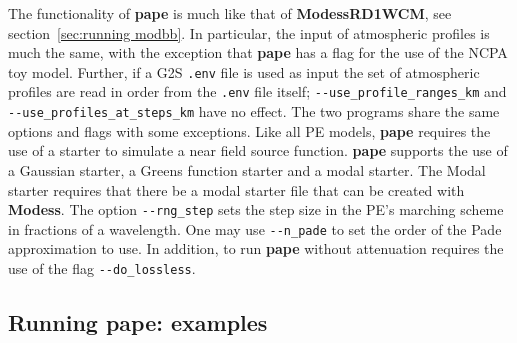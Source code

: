 The functionality of {\bf pape} is much like that of {\bf ModessRD1WCM}, see section~\ref{sec:running modbb}. In particular, the input of atmospheric profiles is much the same, with the exception that {\bf pape} has a flag for the use of the NCPA toy model. Further, if a G2S {\tt .env} file is used as input the set of atmospheric profiles are read in order from the {\tt .env} file itself; \verb+--use_profile_ranges_km+ and \verb+--use_profiles_at_steps_km+ have no effect. The two programs share the same options and flags with some exceptions. Like all PE models, {\bf pape} requires the use of a starter to simulate a near field source function. {\bf pape} supports the use of a Gaussian starter, a Greens function starter and a modal starter. The Modal starter requires that there be a modal starter file that can be created with {\bf Modess}. The option \verb+--rng_step+ sets the step size in the PE's marching scheme in fractions of a wavelength. One may use \verb+--n_pade+ to set the order of the Pade approximation to use. In addition, to run {\bf pape} without attenuation requires the use of the flag \verb+--do_lossless+. 

\subsection{Running pape: examples}
\label{sec: pade examples}

